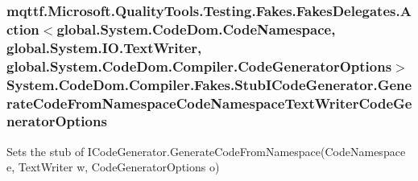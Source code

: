 \hypertarget{class_system_1_1_code_dom_1_1_compiler_1_1_fakes_1_1_stub_i_code_generator_ac49b5e519ec7f58fa56eb050be556e5c}{
\subsubsection[{Generate\-Code\-From\-Namespace\-Code\-Namespace\-Text\-Writer\-Code\-Generator\-Options}]{\setlength{\rightskip}{0pt plus 5cm}mqttf.\-Microsoft.\-Quality\-Tools.\-Testing.\-Fakes.\-Fakes\-Delegates.\-Action$<$global.\-System.\-Code\-Dom.\-Code\-Namespace, global.\-System.\-I\-O.\-Text\-Writer, global.\-System.\-Code\-Dom.\-Compiler.\-Code\-Generator\-Options$>$ System.\-Code\-Dom.\-Compiler.\-Fakes.\-Stub\-I\-Code\-Generator.\-Generate\-Code\-From\-Namespace\-Code\-Namespace\-Text\-Writer\-Code\-Generator\-Options}}\label{class_system_1_1_code_dom_1_1_compiler_1_1_fakes_1_1_stub_i_code_generator_ac49b5e519ec7f58fa56eb050be556e5c}


Sets the stub of I\-Code\-Generator.\-Generate\-Code\-From\-Namespace(\-Code\-Namespace e, Text\-Writer w, Code\-Generator\-Options o)

